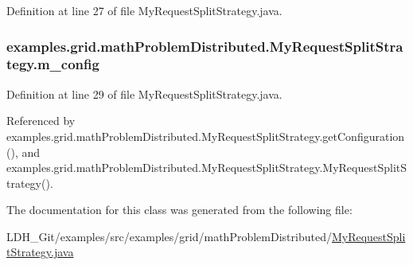 Definition at line 27 of file My\-Request\-Split\-Strategy.\-java.

\hypertarget{classexamples_1_1grid_1_1math_problem_distributed_1_1_my_request_split_strategy_ade69c52c95d134fc7ca519cadd6c94f8}{
\subsubsection[{m\-\_\-config}]{ examples.\-grid.\-math\-Problem\-Distributed.\-My\-Request\-Split\-Strategy.\-m\-\_\-config\hspace{0.3cm}{\ttfamily [private]}}}\label{classexamples_1_1grid_1_1math_problem_distributed_1_1_my_request_split_strategy_ade69c52c95d134fc7ca519cadd6c94f8}


Definition at line 29 of file My\-Request\-Split\-Strategy.\-java.



Referenced by examples.\-grid.\-math\-Problem\-Distributed.\-My\-Request\-Split\-Strategy.\-get\-Configuration(), and examples.\-grid.\-math\-Problem\-Distributed.\-My\-Request\-Split\-Strategy.\-My\-Request\-Split\-Strategy().



The documentation for this class was generated from the following file\-:\begin{DoxyCompactItemize}
\item 
L\-D\-H\-\_\-\-Git/examples/src/examples/grid/math\-Problem\-Distributed/\hyperlink{math_problem_distributed_2_my_request_split_strategy_8java}{My\-Request\-Split\-Strategy.\-java}\end{DoxyCompactItemize}
